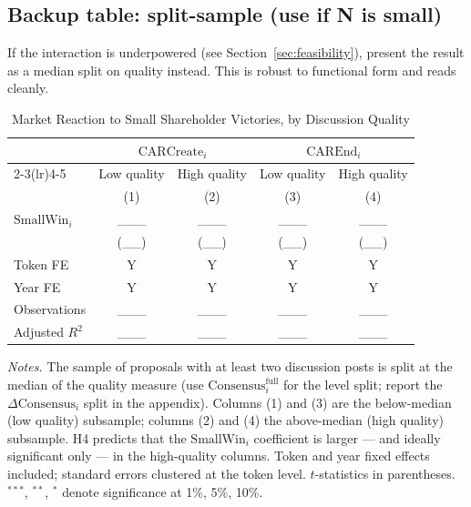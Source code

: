 \documentclass[11pt]{article}
\newcommand{\SmallWin}{\mathrm{SmallWin}}
\newcommand{\Cons}{\Delta\mathrm{Consensus}}
\newcommand{\ConsL}{\mathrm{Consensus}^{\mathrm{full}}}
\begin{document}
\subsection{Backup table: split-sample (use if N is small)}

If the interaction is underpowered (see Section~\ref{sec:feasibility}), present the
result as a median split on quality instead. This is robust to functional form and
reads cleanly.

\begin{table}[h]
\centering
\begin{threeparttable}
\caption{Market Reaction to Small Shareholder Victories, by Discussion Quality}
\label{tab:split}
\small
\begin{tabular}{lcccc}
\toprule
 & \multicolumn{2}{c}{$\mathrm{CARCreate}_i$} & \multicolumn{2}{c}{$\mathrm{CAREnd}_i$} \\
\cmidrule(lr){2-3}\cmidrule(lr){4-5}
 & Low quality & High quality & Low quality & High quality \\
 & (1) & (2) & (3) & (4) \\
\midrule
$\SmallWin_i$ & \_\_\_ & \_\_\_ & \_\_\_ & \_\_\_ \\
              & (\_\_) & (\_\_) & (\_\_) & (\_\_) \\
\midrule
Token FE   & Y & Y & Y & Y \\
Year FE    & Y & Y & Y & Y \\
Observations & \_\_\_ & \_\_\_ & \_\_\_ & \_\_\_ \\
Adjusted $R^2$ & \_\_\_ & \_\_\_ & \_\_\_ & \_\_\_ \\
\bottomrule
\end{tabular}
\begin{tablenotes}[flushleft]
\footnotesize
\item \textit{Notes.} The sample of proposals with at least two discussion posts is split
at the median of the quality measure (use $\ConsL_i$ for the level split; report the
$\Cons_i$ split in the appendix). Columns (1) and (3) are the below-median (low quality)
subsample; columns (2) and (4) the above-median (high quality) subsample. H4 predicts
that the $\SmallWin_i$ coefficient is larger --- and ideally significant only --- in the
high-quality columns. Token and year fixed effects included; standard errors clustered
at the token level. $t$-statistics in parentheses. $^{***}$, $^{**}$, $^{*}$ denote
significance at 1\%, 5\%, 10\%.
\end{tablenotes}
\end{threeparttable}
\end{table}
\end{document}
